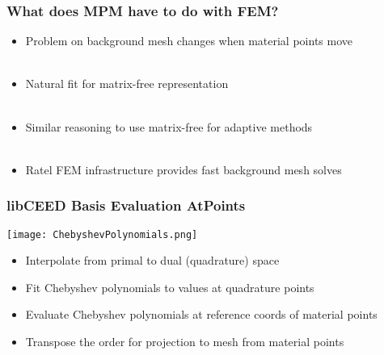 \documentclass{beamer}
\begin{document}

\begin{frame}
\begin{center}
\frametitle{What does MPM have to do with FEM?}

\begin{itemize}

\item Problem on background mesh changes when material points move\\

~\\

\item Natural fit for matrix-free representation\\

~\\

\item Similar reasoning to use matrix-free for adaptive methods\\

~\\

\item Ratel FEM infrastructure provides fast background mesh solves\\

\end{itemize}

\end{center}
\end{frame}


\begin{frame}
\begin{center}
\frametitle{libCEED Basis Evaluation AtPoints}

\begin{center}
\texttt{[image: ChebyshevPolynomials.png]}
\end{center}

\begin{itemize}

\item Interpolate from primal to dual (quadrature) space\\

\item Fit Chebyshev polynomials to values at quadrature points\\

\item Evaluate Chebyshev polynomials at reference coords of material points\\

\item Transpose the order for projection to mesh from material points\\

\end{itemize}

\end{center}
\end{frame}
\end{document}
